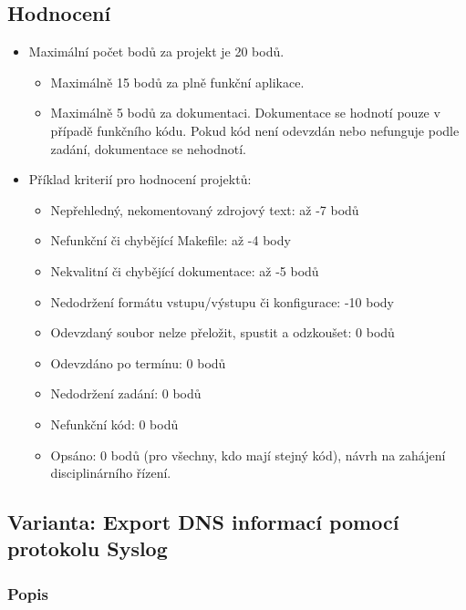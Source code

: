 \documentclass[11pt, a4paper, titlepage]{article}
\begin{document}

\subsection*{Hodnocení}

\begin{itemize}
	\item Maximální počet bodů za projekt je 20 bodů.
	\begin{itemize}
		\item Maximálně 15 bodů za plně funkční aplikace.
		\item Maximálně 5 bodů za dokumentaci. Dokumentace se hodnotí pouze v případě funkčního kódu. Pokud kód není odevzdán nebo nefunguje podle zadání, dokumentace se nehodnotí.
	\end{itemize}
	\item Příklad kriterií pro hodnocení projektů:
	\begin{itemize}
		\item Nepřehledný, nekomentovaný zdrojový text: až -7 bodů
		\item Nefunkční či chybějící Makefile: až -4 body
		\item Nekvalitní či chybějící dokumentace: až -5 bodů
		\item Nedodržení formátu vstupu/výstupu či konfigurace: -10 body
		\item Odevzdaný soubor nelze přeložit, spustit a odzkoušet: 0 bodů
		\item Odevzdáno po termínu: 0 bodů
		\item Nedodržení zadání: 0 bodů
		\item Nefunkční kód: 0 bodů
		\item Opsáno: 0 bodů (pro všechny, kdo mají stejný kód), návrh na zahájení disciplinárního řízení.
	\end{itemize}
\end{itemize}


\subsection*{Varianta: Export DNS informací pomocí protokolu Syslog}

\subsubsection*{Popis}
\end{document}
